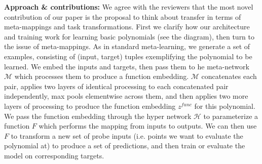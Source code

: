 \documentclass{article}
\begin{document}
\textbf{Approach \& contributions:} We agree with the reviewers that the most novel contribution of our paper is the proposal to think about transfer in terms of meta-mappings and task transformations. First we clarify how our architecture and training work for learning basic polynomials (see the diagram), then turn to the issue of meta-mappings. As in standard meta-learning, we generate a set of examples, consisting of (input, target) tuples exemplifying the polynomial to be learned. We embed the inputs and targets, then pass them to he meta-network $\mathcal{M}$ which processes them to produce a function embedding. $\mathcal{M}$ concatenates each pair, applies two layers of identical processing to each concatenated pair independently, max pools elementwise across them, and then applies two more layers of processing to produce the function embedding $z^{func}$ for this polynomial. We pass the function embedding through the hyper network $\mathcal{H}$ to parameterize a function $F$ which performs the mapping from inputs to outputs. We can then use $F$ to transform a new set of probe inputs (i.e. points we want to evaluate the polynomial at) to produce a set of predictions, and then train or evaluate the model on corresponding targets. \par 
\vspace{-0.1em}
\end{document}
